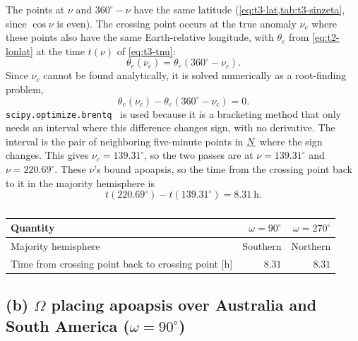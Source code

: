 \begin{newpar}
The points at $\nu$ and $360^\circ - \nu$ have the same latitude (\cref{eq:t3-lat,tab:t3-sinzeta}, since $\cos\nu$ is even). The crossing point occurs at the true anomaly $\nu_c$ where these points also have the same Earth-relative longitude, with $\theta_e$ from \cref{eq:t2-lonlat} at the time $t(\nu)$ of \cref{eq:t3-tnu}:
\begin{equation}
\boxed{\theta_e(\nu_c) = \theta_e(360^\circ-\nu_c)}.
\label{eq:t3-crossing}
\end{equation}
Since $\nu_c$ cannot be found analytically, it is solved numerically as a root-finding problem,
\begin{equation}
\theta_e(\nu_c) - \theta_e(360^\circ-\nu_c) = 0.
\end{equation}
\texttt{scipy.optimize.brentq}~\cite{scipy-brentq} is used because it is a bracketing method that only needs an interval where this difference changes sign, with no derivative. The interval is the pair of neighboring five-minute points in $\underline{N}$ where the sign changes. This gives $\nu_c = 139.31^\circ$, so the two passes are at $\nu = 139.31^\circ$ and $\nu = 220.69^\circ$. These $\nu$'s bound apoapsis, so the time from the crossing point back to it in the majority hemisphere is
\begin{equation}
\boxed{t(220.69^\circ) - t(139.31^\circ) = \SI{8.31}{\hour}}.
\end{equation}
\end{newpar}

\begin{table}[H]
\centering
\caption{}
\label{tab:t3a}
\color{newtext}
\begin{tabular}{@{}lrr@{}}
\toprule
Quantity & $\omega=90^\circ$ & $\omega=270^\circ$ \\
\midrule
Majority hemisphere & Southern & Northern \\
Time from crossing point back to crossing point [\si{\hour}] & $8.31$ & $8.31$ \\
\bottomrule
\end{tabular}
\end{table}

\subsection*{(b) $\Omega$ placing apoapsis over Australia and South America ($\omega=90^\circ$)}

